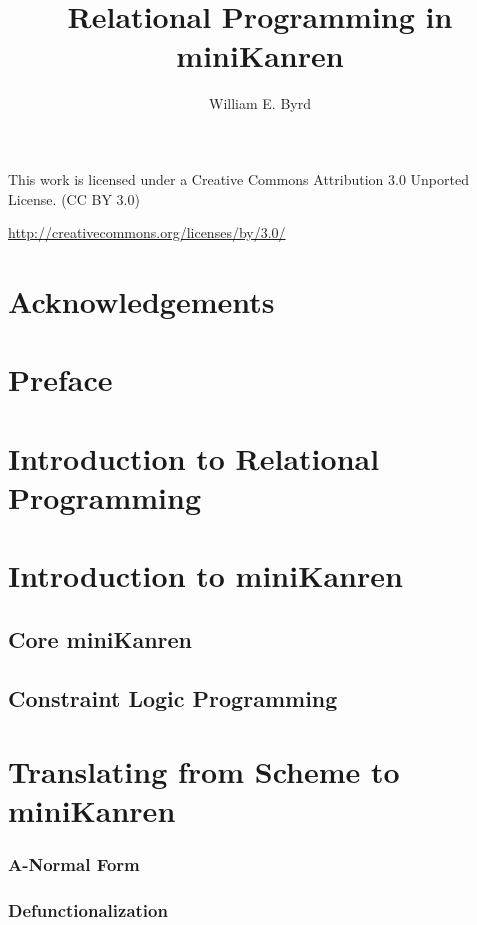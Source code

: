 \documentclass[11pt]{book}
\begin{document}
\begin{schemeregion}

\title{Relational Programming in miniKanren}
\author{William E. Byrd}
\maketitle
\tableofcontents

\newpage
\huge
\noindent
\ccLogo
\ccAttribution

\large
\noindent
This work is licensed under a Creative Commons Attribution 3.0 Unported License.
(CC BY 3.0)

\noindent
\url{http://creativecommons.org/licenses/by/3.0/}
\normalsize

\chapter{Acknowledgements}
\chapter{Preface}

\chapter{Introduction to Relational Programming}

\chapter{Introduction to miniKanren}
\section{Core miniKanren}
\section{Constraint Logic Programming}

\chapter{Translating from Scheme to miniKanren}
\subsection{A-Normal Form}
\subsection{Defunctionalization}

\end{schemeregion}
\end{document}

